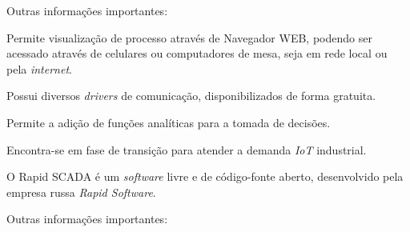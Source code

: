 	    Outras informações importantes:
	    
	    \begin{alineascomponto}
    	    \item Permite visualização de processo através de Navegador \gls{WEB}, podendo ser acessado através de celulares ou computadores de mesa, seja em rede local ou pela \textit{internet}.
        	\item Possui diversos \textit{drivers} de comunicação, disponibilizados de forma gratuita.
        	\item Permite a adição de funções analíticas para a tomada de decisões.
        	\item Encontra-se em fase de transição para atender a demanda \textit{IoT} industrial.
        \end{alineascomponto}
	    
    \label{sec:rapidscada}

        O Rapid SCADA \cite{RapidSCADA} é um \textit{software} livre e de código-fonte aberto, desenvolvido pela empresa russa \textit{Rapid Software}.

        \begin{figure}[!h]
	    \end{figure}
	    
	    Outras informações importantes:
	    
